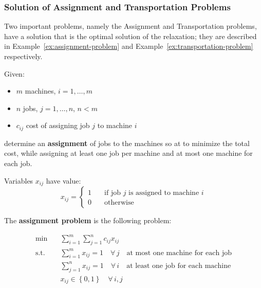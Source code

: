 \documentclass[english]{article}
\begin{document}
\subsubsection{Solution of Assignment and Transportation Problems}

Two important \ILP problems, namely the Assignment and Transportation problems, have a solution that is the optimal solution of the \LP relaxation;
they are described in Example~\ref{ex:assignment-problem} and Example~\ref{ex:transportation-problem} respectively.

\begin{example}
  \label{ex:assignment-problem}

  Given:
  \begin{itemize}
    \item \(m\) machines, \(i = 1, \dots, m\)
    \item \(n\) jobs, \(j = 1, \dots, n\), \(n < m\)
    \item \(c_{ij}\) cost of assigning job \(j\) to machine \(i\)
  \end{itemize}
  determine an \textbf{assignment} of jobs to the machines so at to minimize the total cost, while assigning at least one job per machine and at most one machine for each job.

  Variables \(x_{ij}\) have value:
  \[ x_{ij} = \begin{cases}
      1 \quad & \text{if job } j \text{ is assigned to machine } i \\
      0 \quad & \text{otherwise}
    \end{cases} \]

  The \textbf{assignment problem} is the following \ILP problem:

  \begin{align*}
    \min        & \quad \sum_{i=1}^m \sum_{j=1}^n c_{ij} x_{ij}                                                      \\
    \text{s.t.} & \quad \sum_{i=1}^{m} x_{ij} = 1 \quad \forall \, j \quad \text{at most one machine for each job}   \\
                & \quad \sum_{j=1}^{n} x_{ij} = 1 \quad \forall \, i  \quad \text{at least one job for each machine} \\
                & \quad x_{ij} \in \left\{ 0, 1 \right\} \quad \forall \, i, j
  \end{align*}
\end{example}
\end{document}
